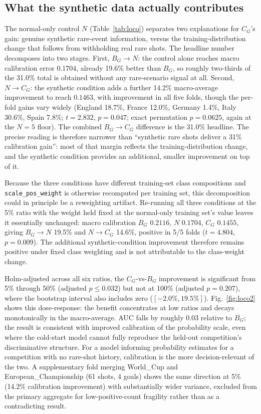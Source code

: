 \documentclass[conference,a4paper]{IEEEtran}
\begin{document}
\subsection{What the synthetic data actually contributes}
\label{sec:modeln}
The normal-only control $N$ (Table~\ref{tab:loco}) separates two explanations for $C_G$'s gain: genuine synthetic rare-event information, versus the training-distribution change that follows from withholding real rare shots. The headline number decomposes into two stages. First, $B_G\!\to\!N$: the control alone reaches macro calibration error $0.1704$, already 19.6\% better than $B_G$, so roughly two-thirds of the 31.0\% total is obtained without any rare-scenario signal at all. Second, $N\!\to\!C_G$: the synthetic condition adds a further 14.2\% macro-average improvement to reach $0.1463$, with improvement in all five folds, though the per-fold gains vary widely (England 18.7\%, France 12.0\%, Germany 1.4\%, Italy 30.6\%, Spain 7.8\%; $t=2.832$, $p=0.047$; exact permutation $p=0.0625$, again at the $N=5$ floor). The combined $B_G\!\to\!C_G$ difference is the 31.0\% headline. The precise reading is therefore narrower than ``synthetic rare shots deliver a 31\% calibration gain'': most of that margin reflects the training-distribution change, and the synthetic condition provides an additional, smaller improvement on top of it.

Because the three conditions have different training-set class compositions and \texttt{scale\_pos\_weight} is otherwise recomputed per training set, this decomposition could in principle be a reweighting artifact. Re-running all three conditions at the 5\% ratio with the weight held fixed at the normal-only training set's value leaves it essentially unchanged: macro calibration $B_G$ $0.2116$, $N$ $0.1704$, $C_G$ $0.1455$, giving $B_G\!\to\!N$ 19.5\% and $N\!\to\!C_G$ 14.6\%, positive in 5/5 folds ($t=4.804$, $p=0.009$). The additional synthetic-condition improvement therefore remains positive under fixed class weighting and is not attributable to the class-weight change.

Holm-adjusted across all six ratios, the $C_G$-vs-$B_G$ improvement is significant from 5\% through 50\% (adjusted $p\le0.032$) but not at 100\% (adjusted $p=0.207$), where the bootstrap interval also includes zero ($[-2.0\%,19.5\%]$). Fig.~\ref{fig:loco2} shows this dose-response: the benefit concentrates at low ratios and decays monotonically in the macro-average. AUC falls by roughly 0.03 relative to $B_G$; the result is consistent with improved calibration of the probability scale, even where the cold-start model cannot fully reproduce the held-out competition's discriminative structure. For a model informing probability estimates for a competition with no rare-shot history, calibration is the more decision-relevant of the two. A supplementary fold merging World\_Cup and European\_Championship (61 shots, 4 goals) shows the same direction at 5\% (14.2\% calibration improvement) with substantially wider variance, excluded from the primary aggregate for low-positive-count fragility rather than as a contradicting result.
\end{document}
